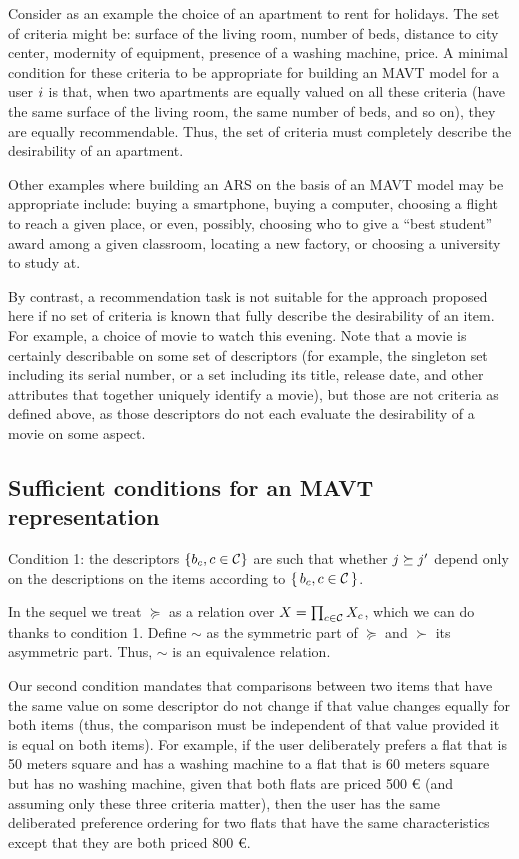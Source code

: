 \documentclass[french, english]{da2pl2018}
\begin{document}
Consider as an example the choice of an apartment to rent for holidays. The set of criteria might be: surface of the living room, number of beds, distance to city center, modernity of equipment, presence of a washing machine, price. A minimal condition for these criteria to be appropriate for building an \ac{MAVT} model for a user $i$ is that, when two apartments are equally valued on all these criteria (have the same surface of the living room, the same number of beds, and so on), they are equally recommendable. Thus, the set of criteria must completely describe the desirability of an apartment.

Other examples where building an \ac{ARS} on the basis of an \ac{MAVT} model may be appropriate include: buying a smartphone, buying a computer, choosing a flight to reach a given place, or even, possibly, choosing who to give a “best student” award among a given classroom, locating a new factory, or choosing a university to study at.

By contrast, a recommendation task is not suitable for the approach proposed here if no set of criteria is known that fully describe the desirability of an item. For example, a choice of movie to watch this evening. Note that a movie is certainly describable on some set of descriptors (for example, the singleton set including its serial number, or a set including its title, release date, and other attributes that together uniquely identify a movie), but those are not criteria as defined above, as those descriptors do not each evaluate the desirability of a movie on some aspect.

\subsection{Sufficient conditions for an MAVT representation}
Condition 1: the descriptors $\{b_c, c \in \mathcal{C}\}$ are such that whether $j \succeq j'$ depend only on the descriptions on the items according to $\set{b_c, c \in \mathcal{C}}$.

In the sequel we treat $\succeq$ as a relation over $X = \prod_{c \in \mathcal{C}} X_c$, which we can do thanks to condition 1.
Define $\sim$ as the symmetric part of $\succeq$ and $\succ$ its asymmetric part.
Thus, $\sim$ is an equivalence relation.

Our second condition mandates that comparisons between two items that have the same value on some descriptor do not change if that value changes equally for both items (thus, the comparison must be independent of that value provided it is equal on both items). For example, if the user deliberately prefers a flat that is 50 meters square and has a washing machine to a flat that is 60 meters square but has no washing machine, given that both flats are priced 500 € (and assuming only these three criteria matter), then the user has the same deliberated preference ordering for two flats that have the same characteristics except that they are both priced 800 €.
\end{document}
